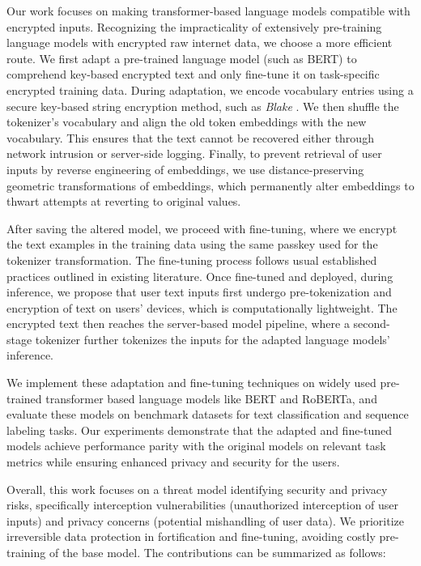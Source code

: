 \documentclass[letterpaper]{article} %
\begin{document}
Our work focuses on making transformer-based language models compatible with encrypted inputs. Recognizing the impracticality of extensively pre-training language models with encrypted raw internet data, we choose a more efficient route. We first adapt a pre-trained language model (such as BERT) to comprehend key-based encrypted text and only fine-tune it on task-specific encrypted training data. During adaptation, we encode vocabulary entries using a secure key-based string encryption method, such as \emph{Blake} \cite{blake2}. We then shuffle the tokenizer's vocabulary and align the old token embeddings with the new vocabulary. This ensures that the text cannot be recovered either through network intrusion or server-side logging. Finally, to prevent retrieval of user inputs by reverse engineering of embeddings, we use distance-preserving geometric transformations of embeddings, which permanently alter embeddings to thwart attempts at reverting to original values.

After saving the altered model, we proceed with fine-tuning, where we encrypt the text examples in the training data using the same passkey used for the tokenizer transformation. The fine-tuning process follows usual established practices outlined in existing literature. Once fine-tuned and deployed, during inference, we propose that user text inputs first undergo pre-tokenization and encryption of text on users' devices, which is computationally lightweight. The encrypted text then reaches the server-based model pipeline, where a second-stage tokenizer further tokenizes the inputs for the adapted language models' inference.

We implement these adaptation and fine-tuning techniques on widely used pre-trained transformer based language models like BERT and RoBERTa, and evaluate these models on benchmark datasets for text classification and sequence labeling tasks. Our experiments demonstrate that the adapted and fine-tuned models achieve performance parity with the original models on relevant task metrics while ensuring enhanced privacy and security for the users.

Overall, this work focuses on a threat model identifying security and privacy risks, specifically interception vulnerabilities (unauthorized interception of user inputs) and privacy concerns (potential mishandling of user data). We prioritize irreversible data protection in fortification and fine-tuning, avoiding costly pre-training of the base model. The contributions can be summarized as follows:
\end{document}
